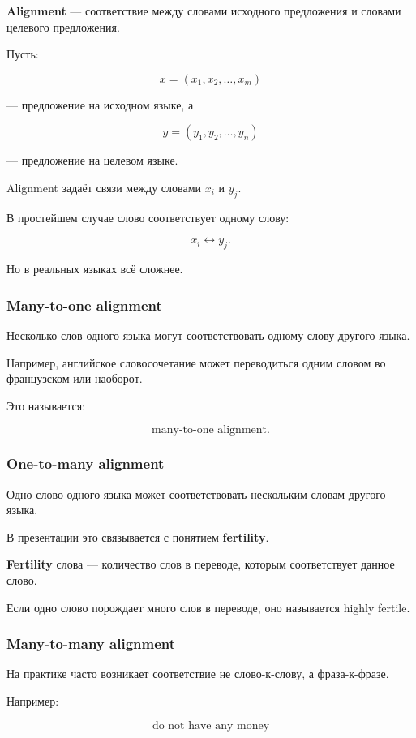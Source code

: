 \documentclass[a4paper,12pt]{article}
\begin{document}
\textbf{Alignment} --- соответствие между словами исходного предложения и словами целевого предложения.

Пусть:

\[
x = (x_1, x_2, \dots, x_m)
\]

--- предложение на исходном языке, а

\[
y = (y_1, y_2, \dots, y_n)
\]

--- предложение на целевом языке.

Alignment задаёт связи между словами \(x_i\) и \(y_j\).

В простейшем случае слово соответствует одному слову:

\[
x_i \leftrightarrow y_j.
\]

Но в реальных языках всё сложнее.

\subsubsection{Many-to-one alignment}

Несколько слов одного языка могут соответствовать одному слову другого языка.

Например, английское словосочетание может переводиться одним словом во французском или наоборот.

Это называется:

\[
\text{many-to-one alignment}.
\]

\subsubsection{One-to-many alignment}

Одно слово одного языка может соответствовать нескольким словам другого языка.

В презентации это связывается с понятием \textbf{fertility}.

\textbf{Fertility} слова --- количество слов в переводе, которым соответствует данное слово.

Если одно слово порождает много слов в переводе, оно называется highly fertile.

\subsubsection{Many-to-many alignment}

На практике часто возникает соответствие не слово-к-слову, а фраза-к-фразе.

Например:

\[
\text{do not have any money}
\]
\end{document}
